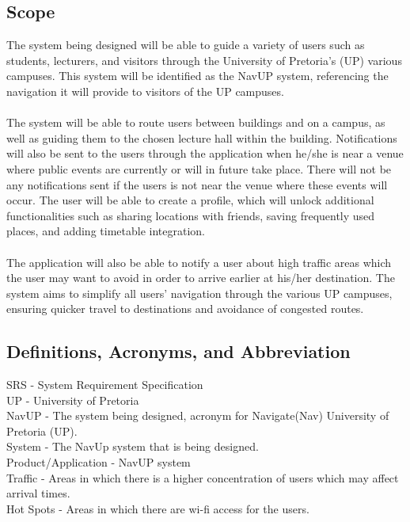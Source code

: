 \documentclass[12pt, a4paper]{article}
\begin{document}
\subsection{Scope}
The system being designed will be able to guide a variety of users such as students, lecturers, and visitors through the University of Pretoria's (UP) various campuses. This system will be identified as the NavUP system, referencing the navigation it will provide to visitors of the UP campuses. \\\\

The system will be able to route users between buildings and on a campus, as well as guiding them to the chosen lecture hall within the building. Notifications will also be sent to the users through the application when he/she is near a venue where public events are currently or will in future take place. There will not be any notifications sent if the users is not near the venue where these events will occur. The user will be able to create a profile, which will unlock additional functionalities such as sharing locations with friends, saving frequently used places, and adding timetable integration.\\\\

The application will also be able to notify a user about high traffic areas which the user may want to avoid in order to arrive earlier at his/her destination. The system aims to simplify all users' navigation through the various UP campuses, ensuring quicker travel to destinations and avoidance of congested routes.\\

\subsection{Definitions, Acronyms, and Abbreviation}
SRS - System Requirement Specification\\
UP - University of Pretoria\\
NavUP - The system being designed, acronym for Navigate(Nav) University of Pretoria (UP).\\
System - The NavUp system that is being designed.\\
Product/Application - NavUP system\\
Traffic - Areas in which there is a higher concentration of users which may affect arrival times.\\
Hot Spots - Areas in which there are wi-fi access for the users.\\
\end{document}
